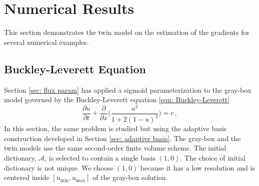 %

\newpage
\section{Numerical Results}
\label{sec: twin numerical results}
This section demonstrates the twin model on the estimation of the gradients for
several numerical examples.


\subsection{Buckley-Leverett Equation}
\label{sec: chap 2 BL}
Section \ref{sec: flux param} has applied a sigmoid parameterization to the gray-box model
governed by the Buckley-Leverett equation \eqref{eqn: Buckley-Leverett}
\begin{equation*}
    \frac{\partial u}{\partial t} + \frac{\partial}{\partial x}\Big({
    \frac{u^2}{1+ 2(1-u)^2}} \Big) = c\,,
\end{equation*}
In this section, the same problem 
is studied but using the adaptive basis construction developed 
in Section \ref{sec: adaptive basis}. The gray-box and the
twin models use the same second-order finite volume scheme.
The initial dictionary, $\mathcal{A}$, is selected to contain a single basis
$\left(1, 0\right)$. The choice of initial dictionary is not unique.
We choose $\left(1, 0\right)$ because it has a low resolution 
and is centered inside $\left[u_{\min}, u_{\max}\right]$ of the gray-box solution.\\

